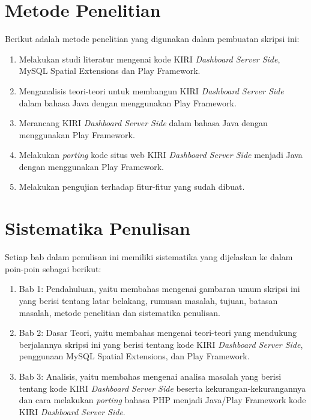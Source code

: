\section{Metode Penelitian}
\label{sec:metode_penelitian}
Berikut adalah metode penelitian yang digunakan dalam pembuatan skripsi ini:
	\begin{enumerate}
		\item Melakukan studi literatur mengenai kode KIRI \textit{Dashboard Server Side}, MySQL Spatial Extensions dan Play Framework.
		\item Menganalisis teori-teori untuk membangun KIRI \textit{Dashboard Server Side} dalam bahasa Java dengan menggunakan Play Framework.
		\item Merancang KIRI \textit{Dashboard Server Side} dalam bahasa Java dengan menggunakan Play Framework.
		\item Melakukan \textit{porting} kode situs web KIRI \textit{Dashboard Server Side} menjadi Java dengan menggunakan Play Framework.
		\item Melakukan pengujian terhadap fitur-fitur yang sudah dibuat.
	\end{enumerate}

\section{Sistematika Penulisan}
\label{sec:sistematika_penulisan}
Setiap bab dalam penulisan ini memiliki sistematika yang dijelaskan ke dalam poin-poin sebagai berikut:
	\begin{enumerate}
		\item Bab 1: Pendahuluan, yaitu membahas mengenai gambaran umum skripsi ini yang berisi tentang latar belakang, rumusan masalah, tujuan, batasan masalah, metode penelitian dan sistematika penulisan.
		\item Bab 2: Dasar Teori, yaitu membahas mengenai teori-teori yang mendukung berjalannya skripsi ini yang berisi tentang kode KIRI \textit{Dashboard Server Side}, penggunaan MySQL Spatial Extensions, dan Play Framework.
		\item Bab 3: Analisis, yaitu membahas mengenai analisa masalah yang berisi tentang kode KIRI \textit{Dashboard Server Side} beserta kekurangan-kekurangannya dan cara melakukan \textit{porting} bahasa PHP menjadi Java/Play Framework kode KIRI \textit{Dashboard Server Side}.
	\end{enumerate}